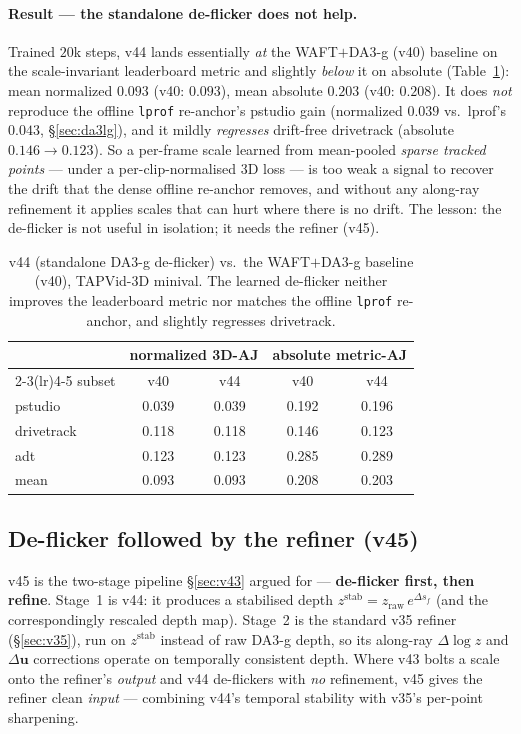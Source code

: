 \documentclass[11pt,a4paper]{article}
\begin{document}
\paragraph{Result --- the standalone de-flicker does not help.}
Trained $20$k steps, v44 lands essentially \emph{at} the WAFT$+$DA3-g (v40) baseline on the scale-invariant
leaderboard metric and slightly \emph{below} it on absolute (Table~\ref{tab:v44}): mean normalized $0.093$
(v40: $0.093$), mean absolute $0.203$ (v40: $0.208$). It does \emph{not} reproduce the offline
\texttt{lprof} re-anchor's pstudio gain (normalized $0.039$ vs.\ lprof's $0.043$, \S\ref{sec:da3lg}), and it
mildly \emph{regresses} drift-free drivetrack (absolute $0.146\!\to\!0.123$). So a per-frame scale learned
from mean-pooled \emph{sparse tracked points} --- under a per-clip-normalised 3D loss --- is too weak a
signal to recover the drift that the dense offline re-anchor removes, and without any along-ray refinement
it applies scales that can hurt where there is no drift. The lesson: the de-flicker is not useful in
isolation; it needs the refiner (v45).

\begin{table}[h]
\centering
\caption{v44 (standalone DA3-g de-flicker) vs.\ the WAFT$+$DA3-g baseline (v40), TAPVid-3D minival. The
learned de-flicker neither improves the leaderboard metric nor matches the offline \texttt{lprof} re-anchor,
and slightly regresses drivetrack.}
\label{tab:v44}
\begin{tabular}{lcccc}
\toprule
 & \multicolumn{2}{c}{normalized 3D-AJ} & \multicolumn{2}{c}{absolute metric-AJ} \\
\cmidrule(lr){2-3}\cmidrule(lr){4-5}
subset & v40 & v44 & v40 & v44 \\
\midrule
pstudio    & 0.039 & 0.039 & 0.192 & 0.196 \\
drivetrack & 0.118 & 0.118 & 0.146 & 0.123 \\
adt        & 0.123 & 0.123 & 0.285 & 0.289 \\
\midrule
mean       & 0.093 & 0.093 & 0.208 & 0.203 \\
\bottomrule
\end{tabular}
\end{table}

\subsection{De-flicker followed by the refiner (v45)}
\label{sec:v45}
v45 is the two-stage pipeline \S\ref{sec:v43} argued for --- \textbf{de-flicker first, then refine}.
Stage~1 is v44: it produces a stabilised depth $z^{\text{stab}}=z_{\text{raw}}\,e^{\Delta s_f}$ (and the
correspondingly rescaled depth map). Stage~2 is the standard v35 refiner (\S\ref{sec:v35}), run on
$z^{\text{stab}}$ instead of raw DA3-g depth, so its along-ray $\Delta\log z$ and $\Delta\mathbf{u}$
corrections operate on temporally consistent depth. Where v43 bolts a scale onto the refiner's \emph{output}
and v44 de-flickers with \emph{no} refinement, v45 gives the refiner clean \emph{input} --- combining v44's
temporal stability with v35's per-point sharpening.
\end{document}
